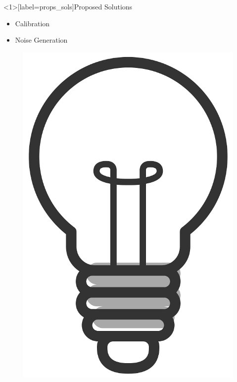 \documentclass[aspectratio=169]{beamer}
[aspectratio=169] %
\begin{document}
\begin{frame}<1>[label=props_sols]{Proposed Solutions}
  \begin{minipage}{0.49\textwidth} 
    \begin{itemize}
      \item<1> Calibration
      \item<2> Noise Generation
    \end{itemize}
  \end{minipage}
  \hfill
  \begin{minipage}{0.49\textwidth} 
    \begin{figure}
      \centering
      \includegraphics[height=0.5\textheight]{figures/light-bulb.png}
    \end{figure}
  \end{minipage}
\end{frame}
\end{document}
